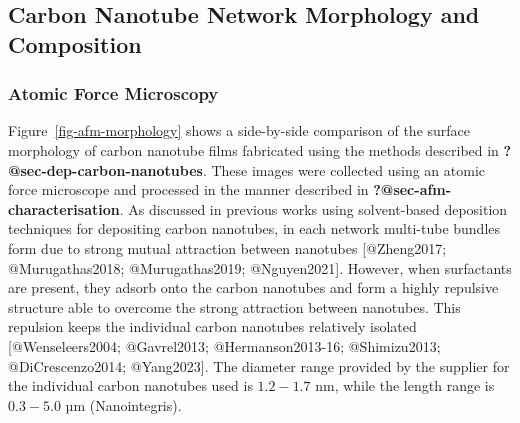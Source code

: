 \documentclass[
  letterpaper,
  DIV=11,
  numbers=noendperiod]{scrartcl}
\begin{document}
\hypertarget{sec-pristine-morphology}{%
\subsection{Carbon Nanotube Network Morphology and
Composition}\label{sec-pristine-morphology}}

\hypertarget{sec-pristine-AFM}{%
\subsubsection{Atomic Force Microscopy}\label{sec-pristine-AFM}}

Figure~\ref{fig-afm-morphology} shows a side-by-side comparison of the
surface morphology of carbon nanotube films fabricated using the methods
described in \textbf{?@sec-dep-carbon-nanotubes}. These images were
collected using an atomic force microscope and processed in the manner
described in \textbf{?@sec-afm-characterisation}. As discussed in
previous works using solvent-based deposition techniques for depositing
carbon nanotubes, in each network multi-tube bundles form due to strong
mutual attraction between nanotubes {[}@Zheng2017; @Murugathas2018;
@Murugathas2019; @Nguyen2021{]}. However, when surfactants are present,
they adsorb onto the carbon nanotubes and form a highly repulsive
structure able to overcome the strong attraction between nanotubes. This
repulsion keeps the individual carbon nanotubes relatively isolated
{[}@Wenseleers2004; @Gavrel2013; @Hermanson2013-16; @Shimizu2013;
@DiCrescenzo2014; @Yang2023{]}. The diameter range provided by the
supplier for the individual carbon nanotubes used is \(1.2-1.7\) nm,
while the length range is \(0.3-5.0\) µm (Nanointegris).
\end{document}
